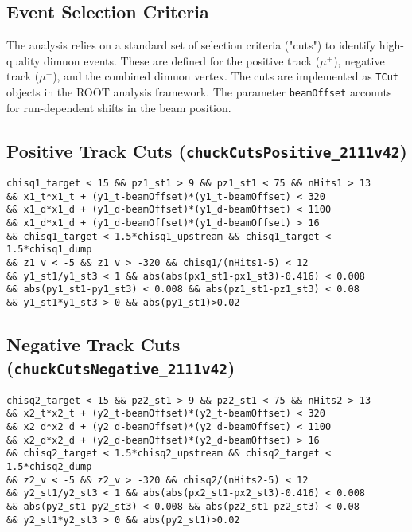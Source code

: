 \documentclass[11pt]{article}
\begin{document}
\begin{appendices}

\section{Event Selection Criteria}
\label{app:event_selection}

The analysis relies on a standard set of selection criteria ("cuts") to identify high-quality dimuon events. These are defined for the positive track ($\mu^+$), negative track ($\mu^-$), and the combined dimuon vertex. The cuts are implemented as \texttt{TCut} objects in the ROOT analysis framework. The parameter \texttt{beamOffset} accounts for run-dependent shifts in the beam position.

\subsection{Positive Track Cuts (\texttt{chuckCutsPositive\_2111v42})}
\label{cut:chuck_positive}
{\small\begin{verbatim}
chisq1_target < 15 && pz1_st1 > 9 && pz1_st1 < 75 && nHits1 > 13
&& x1_t*x1_t + (y1_t-beamOffset)*(y1_t-beamOffset) < 320
&& x1_d*x1_d + (y1_d-beamOffset)*(y1_d-beamOffset) < 1100
&& x1_d*x1_d + (y1_d-beamOffset)*(y1_d-beamOffset) > 16
&& chisq1_target < 1.5*chisq1_upstream && chisq1_target < 1.5*chisq1_dump
&& z1_v < -5 && z1_v > -320 && chisq1/(nHits1-5) < 12
&& y1_st1/y1_st3 < 1 && abs(abs(px1_st1-px1_st3)-0.416) < 0.008
&& abs(py1_st1-py1_st3) < 0.008 && abs(pz1_st1-pz1_st3) < 0.08
&& y1_st1*y1_st3 > 0 && abs(py1_st1)>0.02
\end{verbatim}}

\subsection{Negative Track Cuts (\texttt{chuckCutsNegative\_2111v42})}
\label{cut:chuck_negative}
{\small\begin{verbatim}
chisq2_target < 15 && pz2_st1 > 9 && pz2_st1 < 75 && nHits2 > 13
&& x2_t*x2_t + (y2_t-beamOffset)*(y2_t-beamOffset) < 320
&& x2_d*x2_d + (y2_d-beamOffset)*(y2_d-beamOffset) < 1100
&& x2_d*x2_d + (y2_d-beamOffset)*(y2_d-beamOffset) > 16
&& chisq2_target < 1.5*chisq2_upstream && chisq2_target < 1.5*chisq2_dump
&& z2_v < -5 && z2_v > -320 && chisq2/(nHits2-5) < 12
&& y2_st1/y2_st3 < 1 && abs(abs(px2_st1-px2_st3)-0.416) < 0.008
&& abs(py2_st1-py2_st3) < 0.008 && abs(pz2_st1-pz2_st3) < 0.08
&& y2_st1*y2_st3 > 0 && abs(py2_st1)>0.02
\end{verbatim}}


\end{appendices}
\end{document}
